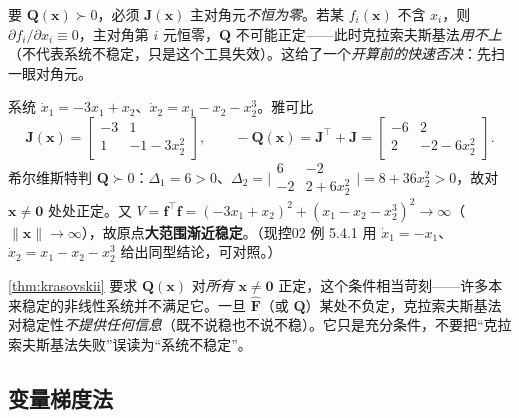 \begin{insight}[一个结构性的必要条件]
要 $\mathbf{Q}(\mathbf{x})\succ0$，必须 $\mathbf{J}(\mathbf{x})$ 主对角元\emph{不恒为零}。若某 $f_i(\mathbf{x})$ 不含 $x_i$，则 $\partial f_i/\partial x_i\equiv0$，主对角第 $i$ 元恒零，$\mathbf{Q}$ 不可能正定——此时克拉索夫斯基法\emph{用不上}（不代表系统不稳定，只是这个工具失效）。这给了一个\emph{开算前的快速否决}：先扫一眼对角元。
\end{insight}

\begin{example}[克拉索夫斯基法]\label{ex:krasovskii}
系统 $\dot x_1=-3x_1+x_2$、$\dot x_2=x_1-x_2-x_2^3$。雅可比
\[
  \mathbf{J}(\mathbf{x})=\begin{bmatrix}-3&1\\1&-1-3x_2^2\end{bmatrix},\qquad
  -\mathbf{Q}(\mathbf{x})=\mathbf{J}^\top+\mathbf{J}=\begin{bmatrix}-6&2\\2&-2-6x_2^2\end{bmatrix}.
\]
希尔维斯特判 $\mathbf{Q}\succ0$：$\Delta_1=6>0$、$\Delta_2=\big|\begin{smallmatrix}6&-2\\-2&2+6x_2^2\end{smallmatrix}\big|=8+36x_2^2>0$，故对 $\mathbf{x}\neq\mathbf{0}$ 处处正定。又 $V=\mathbf{f}^\top\mathbf{f}=(-3x_1+x_2)^2+(x_1-x_2-x_2^3)^2\to\infty$（$\|\mathbf{x}\|\to\infty$），故原点\textbf{大范围渐近稳定}。（现控02 例 5.4.1 用 $\dot x_1=-x_1$、$\dot x_2=x_1-x_2-x_2^3$ 给出同型结论，可对照。）
\end{example}

\begin{pitfall}
\cref{thm:krasovskii} 要求 $\mathbf{Q}(\mathbf{x})$ 对\emph{所有} $\mathbf{x}\neq\mathbf{0}$ 正定，这个条件相当苛刻——许多本来稳定的非线性系统并不满足它。一旦 $\hat{\mathbf{F}}$（或 $\mathbf{Q}$）某处不负定，克拉索夫斯基法对稳定性\emph{不提供任何信息}（既不说稳也不说不稳）。它只是充分条件，不要把“克拉索夫斯基法失败”误读为“系统不稳定”。
\end{pitfall}

\subsection{变量梯度法}
\label{sec:lyap-vargrad}

